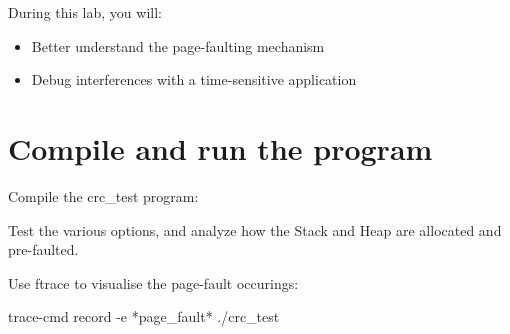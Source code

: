 
During this lab, you will:
\begin{itemize}
  \item Better understand the page-faulting mechanism
  \item Debug interferences with a time-sensitive application
\end{itemize}

\section{Compile and run the program}

Compile the crc\_test program: 

Test the various options, and analyze how the Stack and Heap are allocated and
pre-faulted.

Use ftrace to visualise the page-fault occurings:
\begin{bashinput}
	trace-cmd record -e *page_fault* ./crc_test
\end{bashinput}

